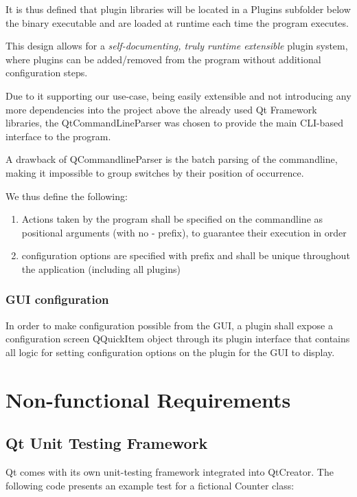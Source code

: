 It is thus defined that plugin libraries will be located in a Plugins subfolder below the binary executable and are loaded at runtime each time the program executes.

This design allows for a \emph{self-documenting, truly runtime extensible} plugin system, where plugins can be added/removed from the program without additional configuration steps.

Due to it supporting our use-case, being easily extensible and not introducing any more dependencies into the project above the already used Qt Framework libraries, the QtCommandLineParser was chosen to provide the main CLI-based interface to the program.

A drawback of QCommandlineParser is the batch parsing of the commandline, making it impossible to group \-\-switches by their position of occurrence.

We thus define the following:
\begin{enumerate}
	\item Actions taken by the program shall be specified on the commandline as positional arguments (with no - prefix), to guarantee their execution in order
	\item configuration options are specified with \-\-prefix and shall be unique throughout the application (including all plugins)
\end{enumerate}

\subsubsection{GUI configuration}
In order to make configuration possible from the GUI, a plugin shall expose a configuration screen QQuickItem object through its plugin interface that contains all logic for setting configuration options on the plugin for the GUI to display.

\section{Non-functional Requirements}

\subsection{Qt Unit Testing Framework}
Qt comes with its own unit-testing framework integrated into QtCreator. The following code presents an example test for a fictional Counter class:

